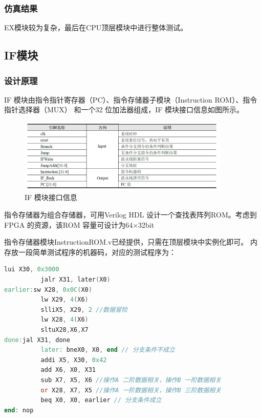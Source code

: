 \documentclass[12pt,hyperref,a4paper,UTF8]{ctexart}
\begin{document}
\subsubsection*{\Large 仿真结果}
\normalsize

EX模块较为复杂，最后在CPU顶层模块中进行整体测试。

\newpage







\subsection{IF模块}
\subsubsection*{\Large 设计原理}
\normalsize

IF 模块由指令指针寄存器（PC）、指令存储器子模块（Instruction ROM）、指令指针选择器（MUX）
和一个32 位加法器组成，IF 模块接口信息如图所示。

     \begin{figure}[H]
        \centering
        \includegraphics[width=0.9\textwidth]{figures/fig/image14.png}
        \caption{IF 模块接口信息}
    \end{figure}

指令存储器为组合存储器，可用Verilog HDL 设计一个查找表阵列ROM。考虑到
FPGA 的资源，该ROM 容量可设计为64×32bit

指令存储器模块InstructionROM.v已经提供，只需在顶层模块中实例化即可。
内存放一段简单测试程序的机器码，对应的测试程序为：
\begin{lstlisting}[language=Verilog,caption=BranchTest仿真文件]
          lui X30, 0x3000
          jalr X31, later(X0)
earlier:sw X28, 0x0C(X0)
          lw X29, 4(X6)
          slliX5, X29, 2 //数据冒险
          lw X28, 4(X6)
          sltuX28,X6,X7
done:jal X31, done
          later: bneX0, X0, end // 分支条件不成立
          addi X5, X30, 0x42
          add X6, X0, X31
          sub X7, X5, X6 //操作A 二阶数据相关，操作B 一阶数据相关
          or X28, X7, X5 //操作A 一阶数据相关，操作B 三阶数据相关
          beq X0, X0, earlier // 分支条件成立
end: nop
\end{lstlisting}
\end{document}
